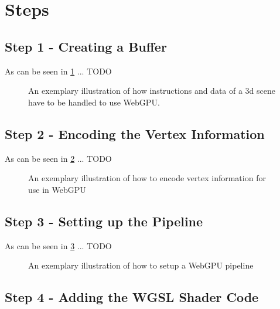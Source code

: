 \section{Steps}




\subsection{Step 1 - Creating a Buffer}

As can be seen in \ref*{code:create-buffer} ... TODO


\begin{figure}[tp]
  \centering

  \caption[Code Snippet: createBuffer]
  {
    An exemplary illustration of how instructions and data of a 3d scene have to be handled
    to use WebGPU.
  }
  \label{code:create-buffer}
\end{figure}


\subsection{Step 2 - Encoding the Vertex Information}
As can be seen in \ref*{code:vertex-encode} ... TODO


\begin{figure}[tp]

  \centering

  \caption[Code Snippet: Vertex Encoding]
  {
    An exemplary illustration of how to encode vertex information for use in WebGPU
  }
  \label{code:vertex-encode}
\end{figure}

\subsection{Step 3 - Setting up the Pipeline}

As can be seen in \ref*{code:pipeline-setup} ... TODO


\begin{figure}[tp]

  \centering

  \caption[Code Snippet: WebGPU Pipeline]
  {
    An exemplary illustration of how to setup a WebGPU pipeline
  }
  \label{code:pipeline-setup}
\end{figure}

\subsection{Step 4 - Adding the WGSL Shader Code}


